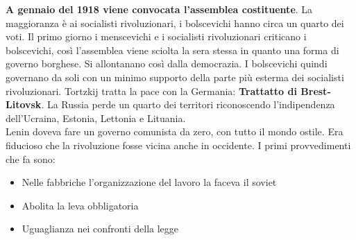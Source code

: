 \textbf{A gennaio del 1918 viene convocata l'assemblea costituente}. La maggioranza è ai socialisti 
rivoluzionari, i bolscevichi hanno circa un quarto dei voti. Il primo giorno i menscevichi e i
socialisti rivoluzionari criticano i bolscevichi, così l'assemblea viene sciolta la sera stessa
in quanto una forma di governo borghese. Si allontanano così dalla democrazia. I bolscevichi quindi
governano da soli con un minimo supporto della parte più esterma dei socialisti rivoluzionari.
Tortzkij tratta la pace con la Germania: \textbf{Trattatto di Brest-Litovsk}. La Russia perde un
quarto dei territori riconoscendo l'indipendenza dell'Ucraina, Estonia, Lettonia e Lituania.\\
[\baselineskip]
Lenin doveva fare un governo comunista da zero, con tutto il mondo ostile. Era fiducioso che la
rivoluzione fosse vicina anche in occidente. I primi provvedimenti che fa sono:
\begin{itemize}
  \item Nelle fabbriche l'organizzazione del lavoro la faceva il soviet
  \item Abolita la leva obbligatoria
  \item Uguaglianza nei confronti della legge
\end{itemize}

